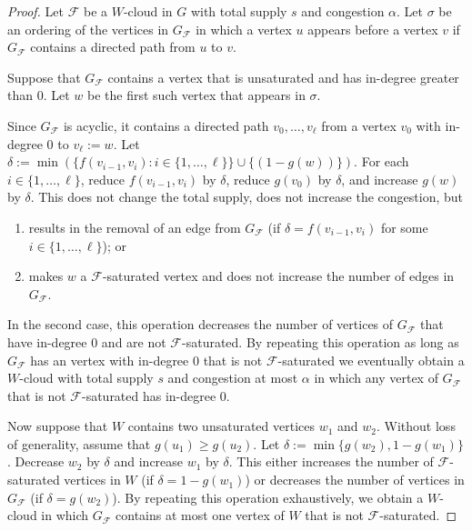 \documentclass{patmorin}
\begin{document}
\begin{proof}
  Let $\mathcal{F}$ be a $W$-cloud in $G$ with total supply $s$ and congestion $\alpha$.  Let $\sigma$ be an ordering of the vertices in $G_\mathcal{F}$ in which a vertex $u$ appears before a vertex $v$ if $G_{\mathcal{F}}$ contains a directed path from $u$ to $v$.
  
  Suppose that $G_{\mathcal{F}}$ contains a vertex that is unsaturated and has in-degree greater than $0$.  Let $w$ be the first such vertex that appears in $\sigma$.
  
  Since $G_{\mathcal{F}}$ is acyclic, it contains a directed path $v_0,\ldots,v_\ell$ from a vertex $v_0$ with in-degree $0$ to $v_\ell:=w$. Let $\delta:=\min(\{f(v_{i-1},v_i):i\in\{1,\ldots,\ell\}\}\cup\{(1-g(w))\})$.  
  For each $i\in\{1,\ldots,\ell\}$, reduce $f(v_{i-1},v_i)$ by $\delta$, reduce $g(v_0)$ by $\delta$, and increase $g(w)$ by $\delta$.  This does not change the total supply, does not increase the congestion, but
  \begin{enumerate}
     \item results in the removal of an edge from $G_\mathcal{F}$ (if $\delta=f(v_{i-1},v_i)$ for some $i\in\{1,\ldots,\ell\}$); or
     \item makes $w$ a $\mathcal{F}$-saturated vertex and does not increase the number of edges in $G_\mathcal{F}$.  
  \end{enumerate}
   In the second case, this operation decreases the number of vertices of $G_{\mathcal{F}}$ that have in-degree $0$ and are not $\mathcal{F}$-saturated.
   By repeating this operation as long as $G_{\mathcal{F}}$ has an vertex with in-degree $0$ that is not $\mathcal{F}$-saturated we eventually obtain a $W$-cloud with total supply $s$ and congestion at most $\alpha$ in which any vertex of $G_{\mathcal{F}}$ that is not $\mathcal{F}$-saturated has in-degree $0$.

   Now suppose that $W$ contains two unsaturated vertices $w_1$ and $w_2$. Without loss of generality, assume that $g(u_1)\ge g(u_2)$.  Let $\delta:=\min\{g(w_2),1-g(w_1)\}$.  Decrease $w_2$ by $\delta$ and increase $w_1$ by $\delta$.  This either increases the number of $\mathcal{F}$-saturated vertices in $W$ (if $\delta=1-g(w_1)$) or decreases the number of vertices in $G_\mathcal{F}$ (if $\delta=g(w_2)$).  By repeating this operation exhaustively, we obtain a $W$-cloud in which $G_{\mathcal{F}}$ contains at most one vertex of $W$ that is not $\mathcal{F}$-saturated.


\end{proof}
\end{document}
